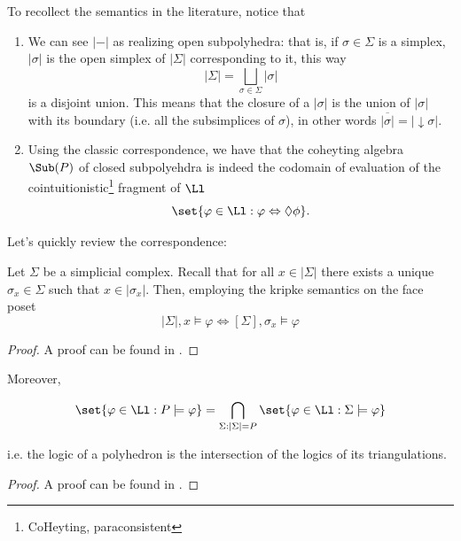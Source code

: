 To recollect the semantics in the literature, notice that 
\begin{enumerate}
    \item We can see $|-|$ as realizing open subpolyhedra: that is, if $\sigma\in \Sigma$ is a simplex,
     $|\sigma|$ is the open simplex of $|\Sigma|$ corresponding to it, this way 
        \[|\Sigma|=\bigsqcup_{\sigma\in\Sigma}|\sigma|\] is a disjoint union.
    This means that the closure of a $|\sigma|$ is the union of $|\sigma|$ with its boundary (i.e. all the subsimplices of $\sigma$), 
    in other words $\overline{|\sigma|}=|\downarrow\sigma|.$
    \item Using the classic correspondence, we have that the coheyting algebra $\Sub(P)$ 
    of closed subpolyehdra is indeed the codomain of evaluation of 
    the cointuitionistic\footnote{CoHeyting, paraconsistent} fragment of $\Ll$
    \[\set{\varphi\in \Ll:\varphi\Leftrightarrow \lozenge \phi}.\]
\end{enumerate}

Let's quickly review the correspondence: 
\begin{lemma}\hfill 

Let $\Sigma$ be a simplicial complex. Recall that for all $x\in |\Sigma|$ there exists a unique $\sigma_x\in \Sigma$ 
such that $x\in |\sigma_x|$.
Then, employing the kripke semantics on the face poset
\[|\Sigma|,x\models \varphi\iff [\Sigma],\sigma_x\models\varphi\]
\end{lemma}
\begin{proof}
A proof can be found in \cite{DBLP}.
\end{proof}
Moreover, 
\begin{lemma}
\[\set{\varphi\in \Ll: P\models\varphi}=\bigcap_{\Sigma:|\Sigma|=P}\set{\varphi\in\Ll:\Sigma\models\varphi}\]

i.e. the logic of a polyhedron is the intersection of the logics of its triangulations.
\end{lemma}
\begin{proof}
A proof can be found in \cite{Dekker}.
\end{proof}


